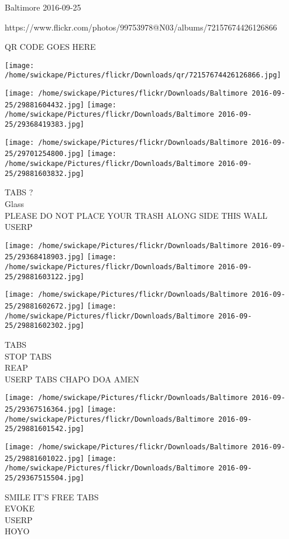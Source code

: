 \documentclass[10pt,letterpaper]{article}
\begin{document}
Baltimore 2016-09-25

https://www.flickr.com/photos/99753978@N03/albums/72157674426126866

QR CODE GOES HERE

\texttt{[image: /home/swickape/Pictures/flickr/Downloads/qr/72157674426126866.jpg]}
\pagebreak

\texttt{[image: /home/swickape/Pictures/flickr/Downloads/Baltimore 2016-09-25/29881604432.jpg]}
\texttt{[image: /home/swickape/Pictures/flickr/Downloads/Baltimore 2016-09-25/29368419383.jpg]}

\texttt{[image: /home/swickape/Pictures/flickr/Downloads/Baltimore 2016-09-25/29701254800.jpg]}
\texttt{[image: /home/swickape/Pictures/flickr/Downloads/Baltimore 2016-09-25/29881603832.jpg]}

TABS ?\\
Glass\\
PLEASE DO NOT PLACE YOUR TRASH ALONG SIDE THIS WALL\\
USERP\\
\pagebreak

\texttt{[image: /home/swickape/Pictures/flickr/Downloads/Baltimore 2016-09-25/29368418903.jpg]}
\texttt{[image: /home/swickape/Pictures/flickr/Downloads/Baltimore 2016-09-25/29881603122.jpg]}

\texttt{[image: /home/swickape/Pictures/flickr/Downloads/Baltimore 2016-09-25/29881602672.jpg]}
\texttt{[image: /home/swickape/Pictures/flickr/Downloads/Baltimore 2016-09-25/29881602302.jpg]}

TABS\\
STOP TABS\\
REAP\\
USERP TABS CHAPO DOA AMEN\\
\pagebreak

\texttt{[image: /home/swickape/Pictures/flickr/Downloads/Baltimore 2016-09-25/29367516364.jpg]}
\texttt{[image: /home/swickape/Pictures/flickr/Downloads/Baltimore 2016-09-25/29881601542.jpg]}

\texttt{[image: /home/swickape/Pictures/flickr/Downloads/Baltimore 2016-09-25/29881601022.jpg]}
\texttt{[image: /home/swickape/Pictures/flickr/Downloads/Baltimore 2016-09-25/29367515504.jpg]}

SMILE IT'S FREE TABS\\
EVOKE\\
USERP\\
HOYO\\
\pagebreak
\end{document}
